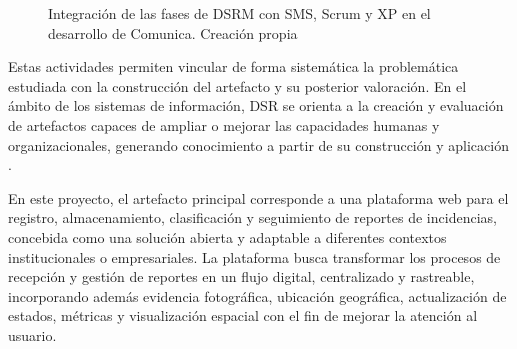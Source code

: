 \begin{figure}[H]
{%
	}
	\caption{Integración de las fases de DSRM con
		SMS, Scrum y XP en el desarrollo de Comunica. Creación propia}
	\label{fig:integracion_metodologica}
\end{figure}
\shorthandon{<>}

Estas actividades permiten vincular de forma sistemática la problemática estudiada con la construcción del artefacto y su posterior valoración. En el ámbito de los sistemas de información, DSR se orienta a la creación y evaluación de artefactos capaces de ampliar o mejorar las capacidades humanas y organizacionales, generando conocimiento a partir de su construcción y aplicación \parencite{hevner2004design}.

En este proyecto, el artefacto principal corresponde a una plataforma web para el registro, almacenamiento, clasificación y seguimiento de reportes de incidencias, concebida como una solución abierta y adaptable a diferentes contextos institucionales o empresariales. La plataforma busca transformar los procesos de recepción y gestión de reportes en un flujo digital, centralizado y rastreable, incorporando además evidencia fotográfica, ubicación geográfica, actualización de estados, métricas y visualización espacial con el fin de mejorar la atención al usuario.

